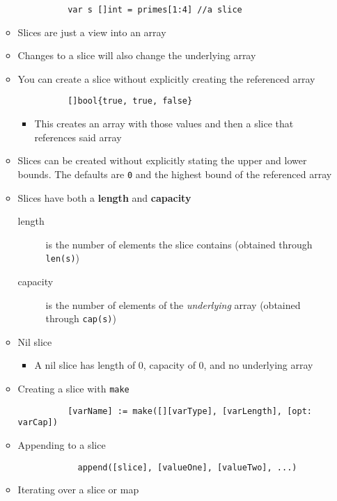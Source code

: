 \documentclass[11pt, oneside]{article}   	%
\begin{document}
\begin{itemize}
\begin{itemize}
\begin{verbatim}
          var s []int = primes[1:4] //a slice
        \end{verbatim}
        \item Slices are just a view into an array
        \item Changes to a slice will also change the underlying array
        \item You can create a slice without explicitly creating the referenced array
        \begin{verbatim}
          []bool{true, true, false}
        \end{verbatim}
          \begin{itemize}
            \item This creates an array with those values and then a slice that references said array
          \end{itemize}
        \item Slices can be created without explicitly stating the upper and lower bounds. The defaults are \texttt{0} and the highest bound of the referenced array
        \item Slices have both a \textbf{length} and \textbf{capacity}
          \begin{description}
            \item[length] is the number of elements the slice contains (obtained through \texttt{len(s)})
            \item[capacity] is the number of elements of the \emph{underlying} array (obtained through \texttt{cap(s)})
          \end{description}
        \item Nil slice
          \begin{itemize}
            \item A nil slice has length of 0, capacity of 0, and no underlying array
          \end{itemize}
        \item Creating a slice with \texttt{make}
          \begin{verbatim}
          [varName] := make([][varType], [varLength], [opt: varCap])
          \end{verbatim}
        \item Appending to a slice
          \begin{verbatim}
            append([slice], [valueOne], [valueTwo], ...)
          \end{verbatim}
        \item Iterating over a slice or map
          \begin{verbatim}

\end{verbatim}
\end{itemize}
\end{itemize}
\end{document}
